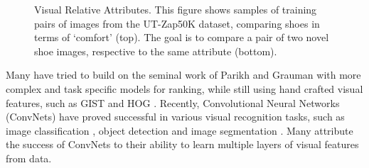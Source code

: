 \begin{figure}
{}
\caption{Visual Relative Attributes. This figure shows samples of training pairs of images from the UT-Zap50K dataset, comparing shoes in terms of `comfort' (top). The goal is to compare a pair of two novel shoe images, respective to the same attribute (bottom).}
\label{fig.1}
\end{figure}

Many have tried to build on the seminal work of Parikh and Grauman \cite{parikh2011} with more complex and task specific models for ranking, while still using hand crafted visual features, such as GIST \cite{Aude01} and HOG \cite{hog}. Recently, Convolutional Neural Networks (ConvNets) have proved successful in various visual recognition tasks, such as image classification \cite{krizshevsky}, object detection \cite{RCNN} and image segmentation \cite{fullyconv}. Many attribute the success of ConvNets to their ability to learn multiple layers of visual features from data. 

